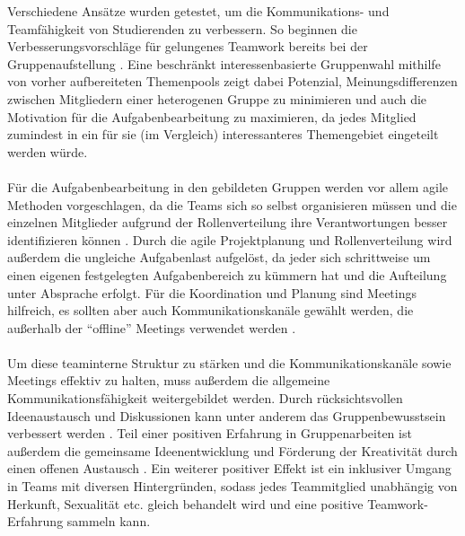 \documentclass[a4paper]{article}
\newcommand{\komm}[1]{{ \color{blue}}}%
\begin{document}
Verschiedene Ansätze wurden getestet, um die Kommunikations- und Teamfähigkeit von Studierenden zu verbessern.
So beginnen die Verbesserungsvorschläge für gelungenes Teamwork bereits bei der Gruppenaufstellung \cite{teamworkstrat_firstsem_engineering}. Eine beschränkt interessenbasierte Gruppenwahl mithilfe von vorher aufbereiteten Themenpools zeigt dabei Potenzial, Meinungsdifferenzen zwischen Mitgliedern einer heterogenen Gruppe zu minimieren und auch die Motivation für die Aufgabenbearbeitung zu maximieren, da jedes Mitglied zumindest in ein für sie (im Vergleich) interessanteres Themengebiet eingeteilt werden würde.\\\\
\komm{viel Gruppenarbeit im Studium it jedoch nicht in dem Maße iteressengeleitet, mit welchen techniken kann dann die Zusammenarbeit verbessert werden}%
Für die Aufgabenbearbeitung in den gebildeten Gruppen werden vor allem agile Methoden vorgeschlagen, da die Teams sich so selbst organisieren müssen und die einzelnen Mitglieder aufgrund der Rollenverteilung ihre Verantwortungen besser identifizieren können \cite{balanced_teamwork_scrum} \cite{teamwork_teaching_engineering_china}. Durch die agile Projektplanung und Rollenverteilung wird außerdem die ungleiche Aufgabenlast aufgelöst, da jeder sich schrittweise um einen eigenen festgelegten Aufgabenbereich zu kümmern hat und die Aufteilung unter Absprache erfolgt. Für die Koordination und Planung sind Meetings hilfreich, es sollten aber auch Kommunikationskanäle gewählt werden, die außerhalb der "`offline"' Meetings verwendet werden \cite{teamwork_teaching_engineering_china}. \\\\
Um diese teaminterne Struktur zu stärken und die Kommunikationskanäle sowie Meetings effektiv zu halten, muss außerdem die allgemeine Kommunikationsfähigkeit weitergebildet werden. Durch rücksichtsvollen Ideenaustausch und Diskussionen kann unter anderem das Gruppenbewusstsein verbessert werden \cite{4Cs_teamwork_china}. Teil einer positiven Erfahrung in Gruppenarbeiten ist außerdem die gemeinsame Ideenentwicklung und Förderung der Kreativität durch einen offenen Austausch \cite{inclusivity_teamwork_southafrica} \cite{4Cs_teamwork_china}. Ein weiterer positiver Effekt ist ein inklusiver Umgang in Teams mit diversen Hintergründen, sodass jedes Teammitglied unabhängig von Herkunft, Sexualität etc. gleich behandelt wird und eine positive Teamwork-Erfahrung sammeln kann. \\\\
\end{document}
